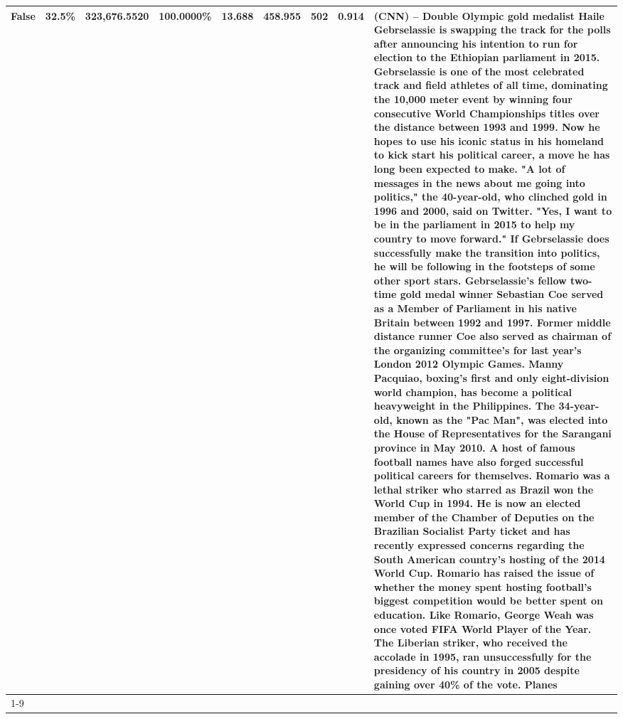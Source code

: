 \begin{table}[H]
{\begin{tabular}{lllrlllll}
False & 32.5\% & 323,676.5520 & \bfseries \color{red} 100.0000\% & 13.688 & 458.955 & 502 & 0.914 & (CNN) -- Double Olympic gold medalist Haile Gebrselassie is swapping the track for the polls after announcing his intention to run for election to the Ethiopian parliament in 2015. Gebrselassie is one of the most celebrated track and field athletes of all time, dominating the 10,000 meter event by winning four consecutive World Championships titles over the distance between 1993 and 1999. Now he hopes to use his iconic status in his homeland to kick start his political career, a move he has long been expected to make. "A lot of messages in the news about me going into politics," the 40-year-old, who clinched gold in 1996 and 2000, said on Twitter. "Yes, I want to be in the parliament in 2015 to help my country to move forward." If Gebrselassie does successfully make the transition into politics, he will be following in the footsteps of some other sport stars. Gebrselassie's fellow two-time gold medal winner Sebastian Coe served as a Member of Parliament in his native Britain between 1992 and 1997. Former middle distance runner Coe also served as chairman of the organizing committee's for last year's London 2012 Olympic Games. Manny Pacquiao, boxing's first and only eight-division world champion, has become a political heavyweight in the Philippines. The 34-year-old, known as the "Pac Man", was elected into the House of Representatives for the Sarangani province in May 2010. A host of famous football names have also forged successful political careers for themselves. Romario was a lethal striker who starred as Brazil won the World Cup in 1994. He is now an elected member of the Chamber of Deputies on the Brazilian Socialist Party ticket and has recently expressed concerns regarding the South American country's hosting of the 2014 World Cup. Romario has raised the issue of whether the money spent hosting football's biggest competition would be better spent on education. Like Romario, George Weah was once voted FIFA World Player of the Year. The Liberian striker, who received the accolade in 1995, ran unsuccessfully for the presidency of his country in 2005 despite gaining over 40\% of the vote. Planes \\
\cline{1-9}

\end{tabular}}
\end{table}
